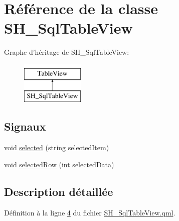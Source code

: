 \hypertarget{classSH__SqlTableView}{\section{Référence de la classe S\-H\-\_\-\-Sql\-Table\-View}
\label{classSH__SqlTableView}
}
Graphe d'héritage de S\-H\-\_\-\-Sql\-Table\-View\-:\begin{figure}[H]
\begin{center}
\leavevmode
\includegraphics[height=2.000000cm]{classSH__SqlTableView}
\end{center}
\end{figure}
\subsection*{Signaux}
\begin{DoxyCompactItemize}
\item 
void \hyperlink{classSH__SqlTableView_a7cf9bda3771eb25c491d305b8e499bb2}{selected} (string selected\-Item)
\item 
void \hyperlink{classSH__SqlTableView_a533497e13dbfc95ee5961e36402fa388}{selected\-Row} (int selected\-Data)
\end{DoxyCompactItemize}


\subsection{Description détaillée}


Définition à la ligne \hyperlink{SH__SqlTableView_8qml_source_l00004}{4} du fichier \hyperlink{SH__SqlTableView_8qml_source}{S\-H\-\_\-\-Sql\-Table\-View.\-qml}.



